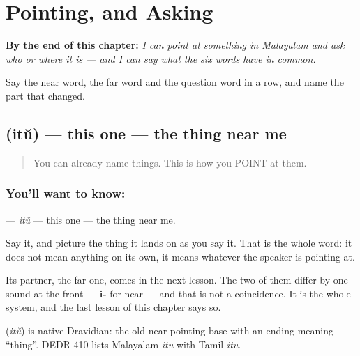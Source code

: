 
\chapter{Pointing, and Asking}
\label{ch:ml-pointing-and-asking}

\begin{chapteropening}
\textbf{By the end of this chapter:} \emph{I can point at something in Malayalam and ask who or where it is — and I can say what the six words have in common.}

Say the near word, the far word and the question word in a row, and name the part that changed.
\end{chapteropening}

\section[\texorpdfstring{\ml{ഇത്} (itŭ)}{ഇത് (itŭ)}]{ (itŭ) — this one — the thing near me}

\label{lesson:ML-C41-this}



\begin{quote}
You can already name things. This is how you POINT at them.
\end{quote}

\subsection*{You'll want to know: }
\textbf{} — \emph{itŭ} — this one — the thing near me.

Say it, and picture the thing it lands on as you say it. That is the whole word: it does not mean anything on its own, it means whatever the speaker is pointing at.

Its partner, the far one, comes in the next lesson. The two of them differ by one sound at the front — \textbf{i-} for near — and that is not a coincidence. It is the whole system, and the last lesson of this chapter says so.

\begin{cousinweb}
\textbf{} (\emph{itŭ}) is native Dravidian: the old near-pointing base with an ending meaning \textquotedblleft{}thing\textquotedblright{}. DEDR 410 lists Malayalam \emph{itu} with Tamil \emph{itu}.
\end{cousinweb}


